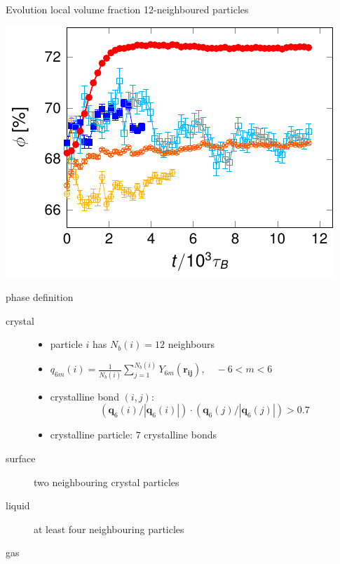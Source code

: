 \documentclass[xcolor=table]{beamer}
\begin{document}
\begin{frame}{Evolution local volume fraction}
	\vspace{\baselineskip}
	12-neighboured particles
	\begin{center}
	\includegraphics{nature/local_phi12.pdf}
	\end{center}
\end{frame}

\begin{frame}{phase definition}
	\begin{description}
	\item[crystal]
		\begin{itemize} 
		\item particle $i$ has $N_b(i)=12$ neighbours
		\item $\displaystyle q_{6 m}(i)=\frac{1}{N_b(i)}\sum_{j=1}^{N_b(i)}
	Y_{6 m}(\mathbf{r_{ij}}),\quad -6 <m<6$
		\item crystalline bond $(i,j)$: \[(\mathbf{q}_{6}(i)/|\mathbf{q}_{6}(i)|)\cdot(\mathbf{q}_{6}(j)/|\mathbf{q}_{6}(j)|)>0.7\]
		\item crystalline particle: $7$ crystalline bonds
		\end{itemize}
	\item[surface] two neighbouring crystal particles
	\item[liquid] at least four neighbouring particles
	\item[gas]
	\end{description}
\end{frame}
\end{document}
